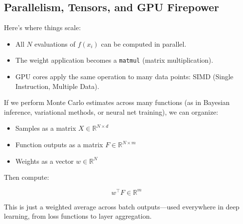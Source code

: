 \subsection{Parallelism, Tensors, and GPU Firepower}

Here’s where things scale:

\begin{itemize}
  \item All \( N \) evaluations of \( f(x_i) \) can be computed in parallel.
  \item The weight application becomes a \texttt{matmul} (matrix multiplication).
  \item GPU cores apply the same operation to many data points: SIMD (Single Instruction, Multiple Data).
\end{itemize}

If we perform Monte Carlo estimates across many functions (as in Bayesian inference, variational methods, or neural net training), we can organize:

\begin{itemize}
  \item Samples as a matrix \( X \in \mathbb{R}^{N \times d} \)
  \item Function outputs as a matrix \( F \in \mathbb{R}^{N \times m} \)
  \item Weights as a vector \( w \in \mathbb{R}^{N} \)
\end{itemize}

Then compute:

\[
w^\top F \in \mathbb{R}^m
\]

This is just a weighted average across batch outputs—used everywhere in deep learning, from loss functions to layer aggregation.



